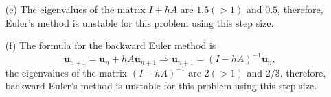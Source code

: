 \begin{sol}
\begin{itemize}
\item[(e)]
  The eigenvalues of the matrix $I+hA$ are $1.5(> 1)$ and $0.5$,
  therefore,
  Euler's method is unstable for this problem using this step size.

\item[(f)]
  The formula for the backward Euler method is
  \begin{displaymath}
    \mathbf{u}_{n+1} = \mathbf{u}_n + hA\mathbf{u}_{n+1} \Rightarrow
    \mathbf{u}_{n+1} = (I-hA)^{-1}\mathbf{u}_n,
  \end{displaymath}
  the eigenvalues of the matrix $(I-hA)^{-1}$ are $2(>1)$ and $2/3$,
  therefore,
  backward Euler's method is unstable for this problem using this step size.
\end{itemize}
\end{sol}

